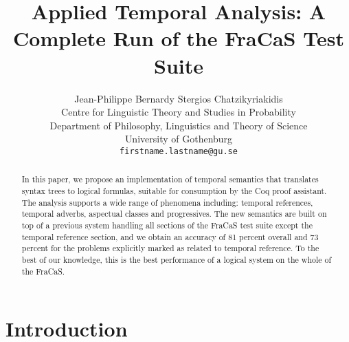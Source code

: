 \documentclass[11pt,a4paper]{article}
\begin{document}
\title{Applied Temporal Analysis: A Complete Run of the FraCaS Test Suite}

\author{
  Jean-Philippe Bernardy    \quad\quad\quad
  Stergios Chatzikyriakidis \\
  Centre for Linguistic Theory and Studies in Probability \\
  Department of Philosophy, Linguistics and Theory of Science \\ University of Gothenburg \\
  \texttt{firstname.lastname@gu.se} \\
}

\maketitle


\begin{abstract}In this paper, we propose an implementation of temporal semantics that
  translates syntax trees to logical formulas, suitable for
 consumption by the Coq proof assistant. The analysis  supports a wide range of phenomena
 including: temporal references, temporal adverbs, aspectual classes
 and progressives.  The new semantics are built on top of a previous system handling all sections of the FraCaS test suite except the temporal reference section, and we  obtain an accuracy of 81 percent overall and 73 percent for the problems explicitly marked
as related to temporal reference. To the best of our knowledge, this is the best performance of a logical system on the whole of the FraCaS. 
\end{abstract}


\section{Introduction}
\label{sec:introduction}
\end{document}
